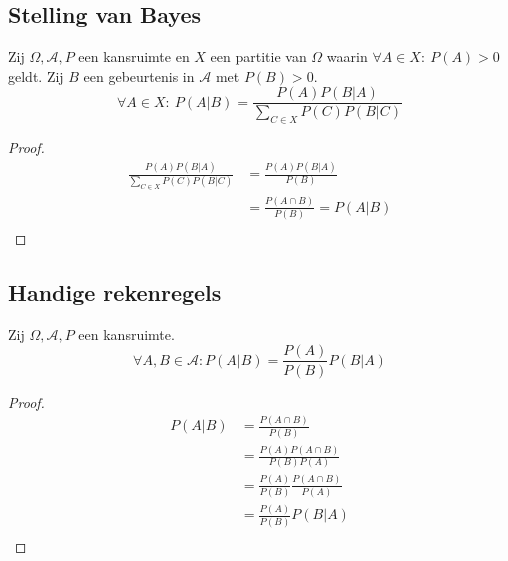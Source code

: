 \documentclass[main.tex]{subfiles}
\begin{document}
\subsection{Stelling van Bayes}
\label{sec:stelling-van-bayes}

\begin{st}
  \label{st:bayes}
  Zij $\Omega,\mathcal{A},P$ een kansruimte en $X$ een partitie van $\Omega$ waarin $\forall A \in X:\ P(A) > 0$ geldt.
  Zij $B$ een gebeurtenis in $\mathcal{A}$ met $P(B) > 0$.
  \[ \forall A\in X:\ P(A|B) = \frac{P(A)P(B|A)}{\sum_{C\in X}P(C)P(B|C)} \]
  \begin{proof}
    \[
      \begin{array}{rl}
        \frac{P(A)P(B|A)}{\sum_{C\in X}P(C)P(B|C)}
        &= \frac{P(A)P(B|A)}{P(B)}\\
        &= \frac{P(A \cap B)}{P(B)} = P(A|B)\\
      \end{array}
    \]
  \end{proof}
\end{st}

\subsection{Handige rekenregels}
\label{sec:handige-rekenregels}

\begin{st}
  Zij $\Omega,\mathcal{A},P$ een kansruimte.
  \[
  \forall A,B \in \mathcal{A}: P(A|B) = \frac{P(A)}{P(B)}P(B|A)
  \]
  
  \begin{proof}
    \[
    \begin{array}{rl}
      P(A|B)
      &= \frac{P(A\cap B)}{P(B)}\\
      &= \frac{P(A)P(A\cap B)}{P(B)P(A)}\\
      &= \frac{P(A)}{P(B)}\frac{P(A\cap B)}{P(A)}\\
      &= \frac{P(A)}{P(B)}P(B|A)\\
    \end{array}
    \]
  \end{proof}
\end{st}
\end{document}
